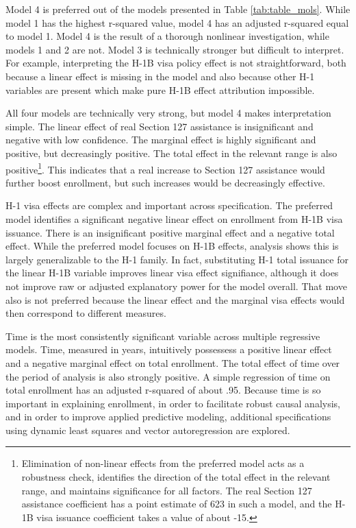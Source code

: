 \documentclass[review]{elsarticle}
\begin{document}
    Model 4 is preferred out of the models presented in Table \ref{tab:table_mols}.
    While model 1 has the highest r-squared value,
    model 4 has an adjusted r-squared equal to model 1.
    Model 4 is the result of a thorough nonlinear investigation,
    while models 1 and 2 are not.
    Model 3 is technically stronger but difficult to interpret.
    For example, interpreting the H-1B visa policy effect is not
    straightforward, both because a linear effect is missing in the model
    and also because other H-1 variables are present which make pure H-1B
    effect attribution impossible.

    All four models are technically very strong,
    but model 4 makes interpretation simple.
    The linear effect of real Section 127 assistance is insignificant and negative with low confidence.
    The marginal effect is highly significant and positive, but decreasingly positive.
    The total effect in the relevant range is also positive\footnote{
        Elimination of non-linear effects from the preferred model acts as a robustness check,
        identifies the direction of the total effect in the relevant range,
        and maintains significance for all factors.
        The real Section 127 assistance coefficient has a point estimate of 623 in such a model,
        and the H-1B visa issuance coefficient takes a value of about -15.
    }.
    This indicates that a real increase to Section 127 assistance would further boost enrollment,
    but such increases would be decreasingly effective.

    H-1 visa effects are complex and important across specification.
    The preferred model identifies a significant negative linear effect on enrollment
    from H-1B visa issuance.
    There is an insignificant positive marginal effect and a negative total effect.
    While the preferred model focuses on H-1B effects, analysis shows this is largely
    generalizable to the H-1 family.
    In fact, substituting H-1 total issuance for the linear H-1B variable improves
    linear visa effect signifiance,
    although it does not improve raw or adjusted explanatory power for the model overall.
    That move also is not preferred because the linear effect and the marginal visa effects would then correspond to different measures.

    Time is the most consistently significant variable across multiple regressive models.
    Time, measured in years, intuitively possessess a positive linear effect and a negative marginal effect on total enrollment.
    The total effect of time over the period of analysis is also strongly positive.
    A simple regression of time on total enrollment has an adjusted r-squared of about .95.
    Because time is so important in explaining enrollment,
    in order to facilitate robust causal analysis,
    and in order to improve applied predictive modeling,
    additional specifications using dynamic least squares and vector autoregression
    are explored.
\end{document}
